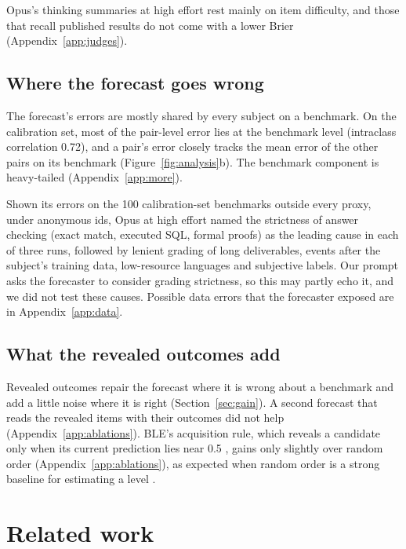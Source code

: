 \documentclass{article}
\begin{document}
Opus's thinking summaries at high effort rest mainly on item difficulty, and those that recall published results do not come with a lower Brier (Appendix~\ref{app:judges}).

\subsection{Where the forecast goes wrong}
\label{sec:errors}

The forecast's errors are mostly shared by every subject on a benchmark. On the calibration set, most of the pair-level error lies at the benchmark level (intraclass correlation 0.72), and a pair's error closely tracks the mean error of the other pairs on its benchmark (Figure~\ref{fig:analysis}b). The benchmark component is heavy-tailed (Appendix~\ref{app:more}).

Shown its errors on the 100 calibration-set benchmarks outside every proxy, under anonymous ids, Opus at high effort named the strictness of answer checking (exact match, executed SQL, formal proofs) as the leading cause in each of three runs, followed by lenient grading of long deliverables, events after the subject's training data, low-resource languages and subjective labels. Our prompt asks the forecaster to consider grading strictness, so this may partly echo it, and we did not test these causes. Possible data errors that the forecaster exposed are in Appendix~\ref{app:data}.

\subsection{What the revealed outcomes add}
\label{sec:labels}

Revealed outcomes repair the forecast where it is wrong about a benchmark and add a little noise where it is right (Section~\ref{sec:gain}). A second forecast that reads the revealed items with their outcomes did not help (Appendix~\ref{app:ablations}). BLE's acquisition rule, which reveals a candidate only when its current prediction lies near 0.5 \cite{lewis1994sequential}, gains only slightly over random order (Appendix~\ref{app:ablations}), as expected when random order is a strong baseline for estimating a level \cite{zhang2025fewer}.

\section{Related work}
\end{document}

